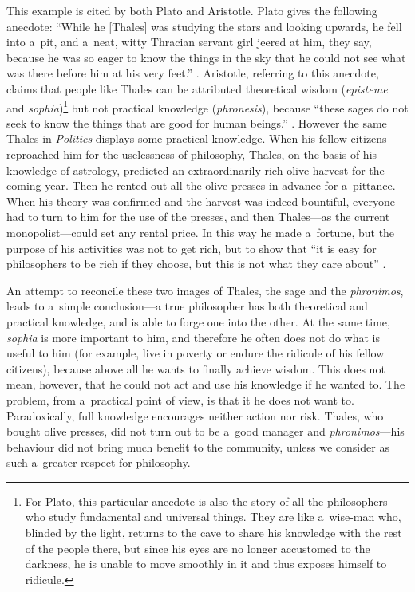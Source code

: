 This example is cited by both Plato and Aristotle. Plato gives the following anecdote: ``While he [Thales] was studying the stars and looking upwards, he fell into a~pit, and a~neat, witty Thracian servant girl jeered at him, they say, because he was so eager to know the things in the sky that he could not see what was there before him at his very feet.'' 
\parencite[][]{}. %
 Aristotle, referring to this anecdote, claims that people like Thales can be attributed theoretical wisdom (\textit{episteme} and \textit{sophia})\footnote{For Plato, this particular anecdote is also the story of all the philosophers who study fundamental and universal things. They are like a~wise-man who, blinded by the light, returns to the cave to share his knowledge with the rest of the people there, but since his eyes are no longer accustomed to the darkness, he is unable to move smoothly in it and thus exposes himself to ridicule.} but not practical knowledge (\textit{phronesis}), because ``these sages do not seek to know the things that are good for human beings.'' 
\parencite[][]{rackham_nicomachean_1934}. %
 However the same Thales in \textit{Politics} displays some practical knowledge. When his fellow citizens reproached him for the uselessness of philosophy, Thales, on the basis of his knowledge of astrology, predicted an extraordinarily rich olive harvest for the coming year. Then he rented out all the olive presses in advance for a~pittance. When his theory was confirmed and the harvest was indeed bountiful, everyone had to turn to him for the use of the presses, and then Thales---as the current monopolist---could set any rental price. In this way he made a~fortune, but the purpose of his activities was not to get rich, but to show that ``it is easy for philosophers to be rich if they choose, but this is not what they care about'' 
\parencite[][]{}.%




An attempt to reconcile these two images of Thales, the sage and the \textit{phronimos}, leads to a~simple conclusion---a true philosopher has both theoretical and practical knowledge, and is able to forge one into the other. At the same time, \textit{sophia} is more important to him, and therefore he often does not do what is useful to him (for example, live in poverty or endure the ridicule of his fellow citizens), because above all he wants to finally achieve wisdom. This does not mean, however, that he could not act and use his knowledge if he wanted to. The problem, from a~practical point of view, is that it he does not want to. Paradoxically, full knowledge encourages neither action nor risk. Thales, who bought olive presses, did not turn out to be a~good manager and \textit{phronimos}---his behaviour did not bring much benefit to the community, unless we consider as such a~greater respect for philosophy.



